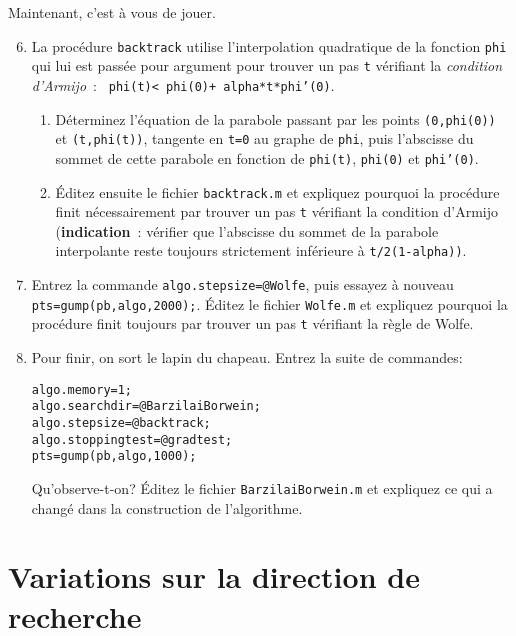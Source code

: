 \documentclass[10pt,a4paper,fleqn]{report}
\newcommand{\onit}{\begin{enumerate}}
\newcommand{\offit}{\end{enumerate}}
\renewcommand{\tt}{\texttt}
\begin{document}
\bigskip

Maintenant, c'est \`a vous de jouer.

\bigskip

\onit \setcounter{enumi}{5}
\item La proc\'edure \tt{backtrack} utilise l'interpolation quadratique de la fonction \tt{phi}  qui lui est pass\'ee pour argument pour trouver un pas \tt t v\'erifiant la \textit{condition d'Armijo}~: 
\tt{ phi(t)< phi(0)+ alpha*t*phi'(0)}. 
\onit
\item D\'eterminez l'\'equation de la parabole passant par les points \tt{(0,phi(0))} et \texttt{(t,phi(t))}, tangente en \tt{t=0} au graphe de \tt{phi}, puis l'abscisse du sommet de cette parabole en fonction de \tt{phi(t)}, \tt{phi(0)} et \tt{phi'(0)}.
\item \'Editez ensuite le fichier \tt{backtrack.m} et expliquez pourquoi la proc\'edure finit n\'ecessairement par trouver un pas \tt t v\'erifiant la condition d'Armijo (\textbf{indication}~: v\'erifier que l'abscisse du sommet de la parabole interpolante reste toujours strictement inf\'erieure \`a \tt{t/2(1-alpha))}.
\offit

\item Entrez la commande \tt{algo.stepsize=@Wolfe}, puis essayez \`a nouveau  \tt{pts=gump(pb,algo,2000);}. \'Editez le fichier \texttt{Wolfe.m} et expliquez pourquoi la proc\'edure finit toujours par trouver un pas \tt t v\'erifiant la r\`egle de Wolfe.

\item Pour finir, on sort le lapin du chapeau. Entrez la suite de commandes:

\hfill\parbox[t]{0.9 \textwidth}{
\tt{algo.memory=1;}\\
\tt{algo.searchdir=@BarzilaiBorwein;}\\
\tt{algo.stepsize=@backtrack;}\\
\tt{algo.stoppingtest=@gradtest;}\\
\tt{pts=gump(pb,algo,1000);}
}
\medskip

Qu'observe-t-on? \'Editez le fichier \tt{BarzilaiBorwein.m} et expliquez ce qui a chang\'e dans la construction de l'algorithme.
\offit

\bigskip

\section{Variations sur la direction de recherche}

\bigskip
\end{document}
